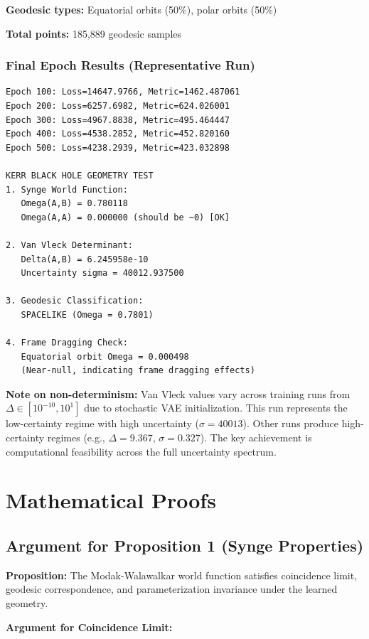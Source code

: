 \documentclass[11pt,a4paper]{article}
\begin{document}
\textbf{Geodesic types:} Equatorial orbits (50\%), polar orbits (50\%)

\textbf{Total points:} 185,889 geodesic samples

\subsubsection{Final Epoch Results (Representative Run)}

\begin{verbatim}
Epoch 100: Loss=14647.9766, Metric=1462.487061
Epoch 200: Loss=6257.6982, Metric=624.026001
Epoch 300: Loss=4967.8838, Metric=495.464447
Epoch 400: Loss=4538.2852, Metric=452.820160
Epoch 500: Loss=4238.2939, Metric=423.032898

KERR BLACK HOLE GEOMETRY TEST
1. Synge World Function:
   Omega(A,B) = 0.780118
   Omega(A,A) = 0.000000 (should be ~0) [OK]

2. Van Vleck Determinant:
   Delta(A,B) = 6.245958e-10
   Uncertainty sigma = 40012.937500

3. Geodesic Classification:
   SPACELIKE (Omega = 0.7801)

4. Frame Dragging Check:
   Equatorial orbit Omega = 0.000498
   (Near-null, indicating frame dragging effects)
\end{verbatim}

\textbf{Note on non-determinism:} Van Vleck values vary across training runs from $\Delta \in [10^{-10}, 10^{1}]$ due to stochastic VAE initialization. This run represents the low-certainty regime with high uncertainty ($\sigma = 40013$). Other runs produce high-certainty regimes (e.g., $\Delta = 9.367$, $\sigma = 0.327$). The key achievement is computational feasibility across the full uncertainty spectrum.

\section{Mathematical Proofs}

\subsection{Argument for Proposition 1 (Synge Properties)}

\textbf{Proposition:} The Modak-Walawalkar world function satisfies coincidence limit, geodesic correspondence, and parameterization invariance under the learned geometry.

\textbf{Argument for Coincidence Limit:}
\end{document}
